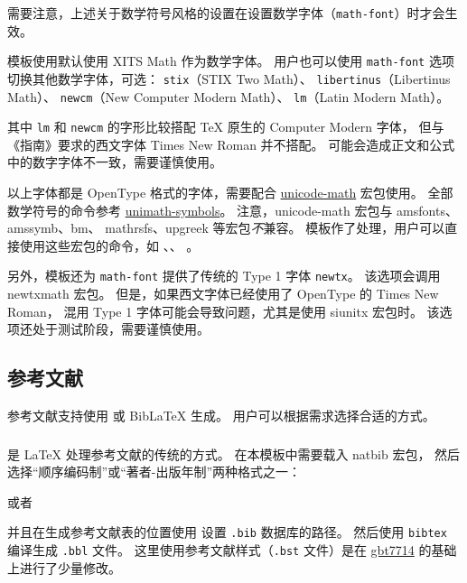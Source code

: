\documentclass[a4paper]{ltxdoc}
\makeatletter
\DeclareRobustCommand\file{\nolinkurl}
\DeclareRobustCommand\pkg{\textsf}
\DeclareRobustCommand\opt{\texttt}
\def\DescribeOption{\leavevmode\@bsphack\begingroup\MakePrivateLetters
  \Describe@Option}
\def\Describe@Option#1{\endgroup
              \marginpar{\raggedleft\PrintDescribeOption{#1}}%
              \SpecialEnvIndex{#1}\@esphack\ignorespaces}
\makeatother
\begin{document}
需要注意，上述关于数学符号风格的设置在设置数学字体（\opt{math-font}）时才会生效。

\DescribeOption{math-font}
模板使用默认使用 XITS Math 作为数学字体。
用户也可以使用 \opt{math-font} 选项切换其他数学字体，可选：
\opt{stix}（STIX Two Math）、
\opt{libertinus}（Libertinus Math）、
\opt{newcm}（New Computer Modern Math）、
\opt{lm}（Latin Modern Math）。

其中 \opt{lm} 和 \opt{newcm} 的字形比较搭配 TeX 原生的 Computer Modern 字体，
但与《指南》要求的西文字体 Times New Roman 并不搭配。
可能会造成正文和公式中的数字字体不一致，需要谨慎使用。

以上字体都是 OpenType 格式的字体，需要配合
\href{http://mirrors.ctan.org/macros/latex/contrib/unicode-math/unicode-math.pdf}{\pkg{unicode-math}}
宏包使用。
全部数学符号的命令参考
\href{http://mirrors.ctan.org/macros/latex/contrib/unicode-math/unimath-symbols.pdf}{\pkg{unimath-symbols}}。
注意，\pkg{unicode-math} 宏包与 \pkg{amsfonts}、\pkg{amssymb}、\pkg{bm}、
\pkg{mathrsfs}、\pkg{upgreek} 等宏包\emph{不}兼容。
模板作了处理，用户可以直接使用这些宏包的命令，如 、、
。

另外，模板还为 \opt{math-font} 提供了传统的 Type 1 字体 \opt{newtx}。
该选项会调用 \pkg{newtxmath} 宏包。
但是，如果西文字体已经使用了 OpenType 的 Times New Roman，
混用 Type 1 字体可能会导致问题，尤其是使用 \pkg{siunitx} 宏包时。
该选项还处于测试阶段，需要谨慎使用。

\subsection{参考文献}

参考文献支持使用 \BibTeX{} 或 BibLaTeX 生成。
用户可以根据需求选择合适的方式。


\subsubsection{\BibTeX}

\BibTeX{} 是 \LaTeX{} 处理参考文献的传统的方式。
在本模板中需要载入 \pkg{natbib} 宏包，
然后选择“顺序编码制”或“著者-出版年制”两种格式之一：
\begin{latex}
  \usepackage[sort]{natbib}
  
\end{latex}
或者
\begin{latex}
  \usepackage{natbib}
  
\end{latex}
并且在生成参考文献表的位置使用  设置 \file{.bib} 数据库的路径。
然后使用 \file{bibtex} 编译生成 \file{.bbl} 文件。
这里使用参考文献样式（\file{.bst} 文件）是在
\href{https://ctan.org/pkg/gbt7714}{\pkg{gbt7714}}
的基础上进行了少量修改。
\end{document}
